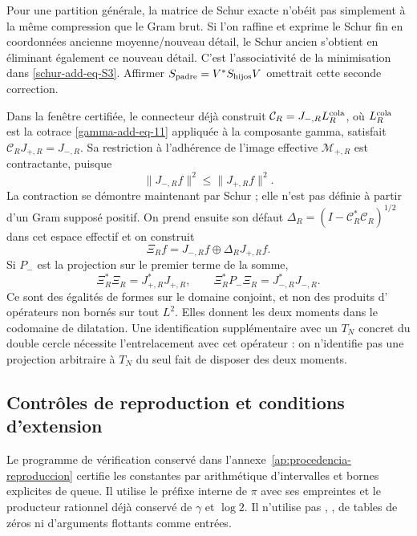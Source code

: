 Pour une partition générale, la matrice de Schur exacte n'obéit pas simplement
à la même compression que le Gram brut. Si l'on raffine et exprime le
Schur fin en coordonnées ancienne moyenne/nouveau détail, le Schur
ancien s'obtient en éliminant également ce nouveau détail. C'est
l'associativité de la minimisation dans \eqref{schur-add-eq-S3}. Affirmer
\(S_{\rm padre}=V^*S_{\rm hijos}V\) omettrait cette seconde correction.

Dans la fenêtre certifiée, le connecteur déjà construit \(\mathcal C_R=J_{-,R}L_R^{\rm cola}\), où \(L_R^{\rm cola}\) est la cotrace \eqref{gamma-add-eq-11} appliquée à la composante gamma, satisfait \(\mathcal C_RJ_{+,R}=J_{-,R}\). Sa restriction à l'adhérence de l'image effective \(\mathcal M_{+,R}\) est contractante, puisque
\begin{equation}
\|J_{-,R}f\|^2\leq\|J_{+,R}f\|^2.
\label{schur-add-display-31}
\end{equation}
La contraction se démontre maintenant par Schur ; elle n'est pas définie à
partir d'un Gram supposé positif. On prend ensuite son défaut
\(\Delta_R=(I-\mathcal C_R^*\mathcal C_R)^{1/2}\) dans cet espace
effectif et on construit
\begin{equation}
\Xi_Rf=J_{-,R}f\oplus\Delta_RJ_{+,R}f.
\label{schur-add-display-32}
\end{equation}
Si \(P_-\) est la projection sur le premier terme de la somme,
\begin{equation}
\Xi_R^*\Xi_R=J_{+,R}^*J_{+,R},\qquad
\Xi_R^*P_-\Xi_R=J_{-,R}^*J_{-,R}.
\label{schur-add-display-33}
\end{equation}
Ce sont des égalités de formes sur le domaine conjoint, et non des produits d'
opérateurs non bornés sur tout \(L^2\). Elles donnent les deux moments dans
le codomaine de dilatation. Une identification supplémentaire avec un
\(T_N\) concret du double cercle nécessite l'entrelacement
avec cet opérateur : on n'identifie pas une projection arbitraire à
\(T_N\) du seul fait de disposer des deux moments.

\subsection{Contrôles de reproduction et conditions d'extension}
\label{schur-add-sub-411}

Le programme de vérification conservé dans l'annexe~\ref{ap:procedencia-reproduccion} certifie les constantes par arithmétique d'intervalles et bornes explicites de queue. Il utilise le préfixe interne de \(\pi\) avec ses empreintes et le producteur rationnel déjà conservé de \(\gamma\) et \(\log2\). Il n'utilise pas \texttt{}, \texttt{}, de tables de zéros ni d'arguments flottants comme entrées.


